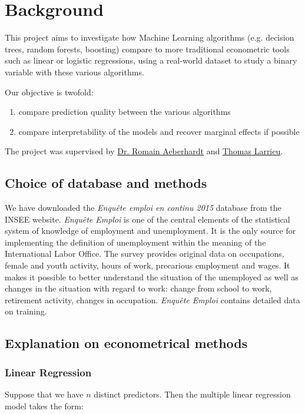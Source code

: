 \section{Background}
This project aims to investigate how Machine Learning algorithms (e.g. decision trees, random
forests, boosting) compare to more traditional econometric tools such as linear or logistic
regressions, using a real-world dataset \cite{enquete} to study a binary variable with these
various algorithms.

Our objective is twofold:
\begin{enumerate}[nosep]
    \item compare prediction quality between the various algorithms
    \item compare interpretability of the models and recover marginal effects if possible
\end{enumerate}

The project was supervised by \href{http://www.crest.fr/pagesperso.php?user=3045}{Dr. Romain
Aeberhardt} and \href{http://thomas-larrieu.strikingly.com/}{Thomas Larrieu}.


\subsection{Choice of database and methods}
We have downloaded the \textit{Enqu\^ete emploi en continu 2015} database from the INSEE website.
\textit{Enqu\^ete Emploi} is one of the central elements of the statistical system of knowledge of
employment and unemployment. It is the only source for implementing the definition of unemployment
within the meaning of the International Labor Office. The survey provides original data on
occupations, female and youth activity, hours of work, precarious employment and wages. It makes it
possible to better understand the situation of the unemployed as well as changes in the situation
with regard to work: change from school to work, retirement activity, changes in occupation.
\textit{Enqu\^ete Emploi} contains detailed data on training.


\subsection{Explanation on econometrical methods}
\subsubsection{Linear Regression}

Suppose that we have $n$ distinct predictors. Then the multiple linear regression model takes the
form:


